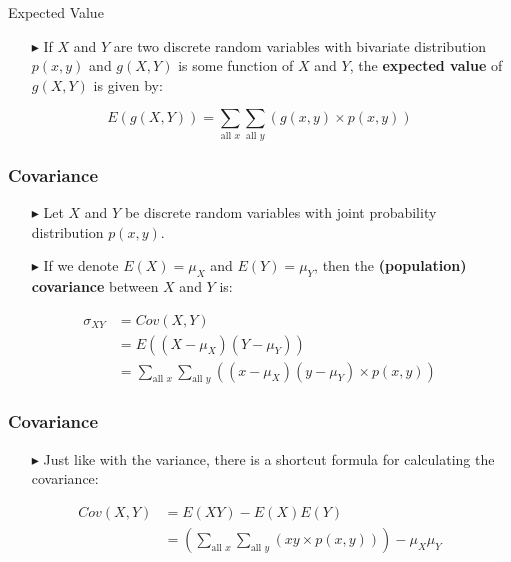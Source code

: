 \documentclass[12pt]{beamer}
\begin{document}
\begin{frame}{Expected Value}

\begin{itemize}
\item[\color{blue}$\blacktriangleright$]If $X$ and $Y$ are two discrete random variables with bivariate distribution $p(x,y)$ and $g(X,Y)$ is some function of $X$ and $Y$, the \textbf{expected value} of $g(X,Y)$ is given by:
\end{itemize}
\[
E(g(X,Y)) = \sum_{\text{all }x} \sum_{\text{all }y} (g(x,y) \times p(x,y))
\]
\end{frame}
\begin{frame}
	\frametitle{Covariance}
	
	\begin{itemize}
		\item[\color{blue}$\blacktriangleright$]Let $X$ and $Y$ be discrete random variables with joint probability distribution $p(x,y)$.
		\item[\color{blue}$\blacktriangleright$]If we denote $E(X) = \mu_X$ and $E(Y) = \mu_Y$, then the \textbf{(population) covariance} between $X$ and $Y$ is:
	\end{itemize}
	
	\vspace{0.5em}
	
	\begin{align*}
		\sigma_{XY} &= Cov(X,Y) \\
		&= E((X - \mu_X)(Y - \mu_Y)) \\
		&= \sum_{\text{all }x}\sum_{\text{all }y} ((x - \mu_X)(y - \mu_Y) \times p(x,y))
	\end{align*}
	
\end{frame}
\begin{frame}
	\frametitle{Covariance}
	
	\begin{itemize}
		\item[\color{blue}$\blacktriangleright$]Just like with the variance, there is a shortcut formula for calculating the covariance:
	\end{itemize}
	
	\vspace{0.5em}
	
	\begin{align*}
		Cov(X,Y) &= E(XY) - E(X)E(Y) \\[1em]
		&= \left(\sum_{\text{all }x}\sum_{\text{all }y} (xy \times p(x,y))\right) - \mu_X\mu_Y
	\end{align*}
	
\end{frame}
\end{document}
